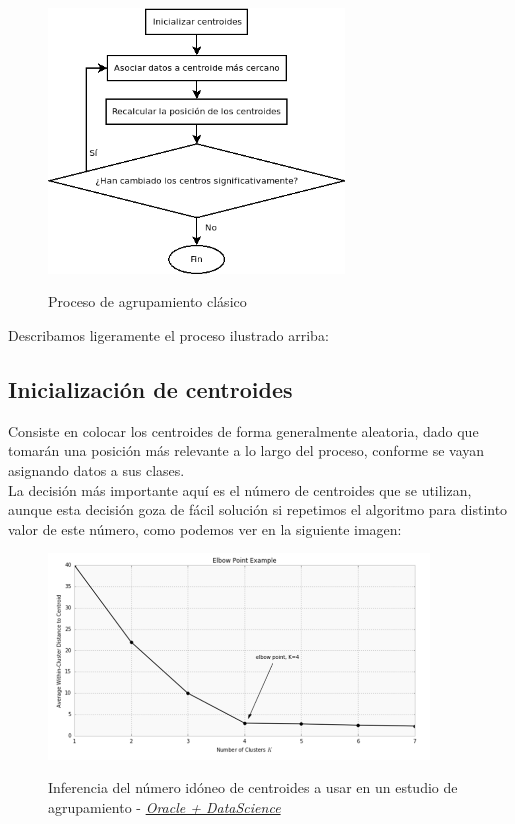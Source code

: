 \documentclass[]{report}
\begin{document}
			\begin{figure}[h]
				\centering
				\includegraphics[width=0.7\textwidth]{agrupamiento-clasico.png}
				\label{clustering-algorithm}
				\caption{Proceso de agrupamiento clásico}
			\end{figure}
		
			Describamos ligeramente el proceso ilustrado arriba:
			
			\subsection{Inicialización de centroides}
			
				Consiste en colocar los centroides de forma generalmente aleatoria, dado que tomarán una posición más relevante a lo largo del proceso, conforme se vayan asignando datos a sus clases.\\
				
				La decisión más importante aquí es el número de centroides que se utilizan, aunque esta decisión goza de fácil solución si repetimos el algoritmo para distinto valor de este número, como podemos ver en la siguiente imagen:
				
				\begin{figure}[h]
					\centering
					\includegraphics[width=0.9\textwidth]{k-means-oracle.png}
					\label{k-means-elbow-point}
					\caption{Inferencia del número idóneo de centroides a usar en un estudio de agrupamiento - \href{https://www.datascience.com/blog/k-means-clustering}{\textit{Oracle + DataScience}}}
				\end{figure}
				
\end{document}
